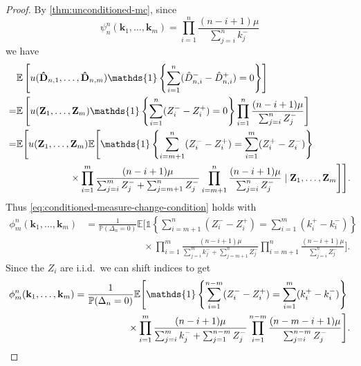 \documentclass[draft]{scrartcl}
\newcommand{\E}{\mathbb E}
\newcommand{\biasD}{\hat{D}}
\newcommand{\unconmc}{\psi}
\newcommand{\conmc}{\phi}
\newcommand{\indi}{\mathds{1}}
\newcommand{\vect}{\mathbf}
\renewcommand{\Pr}{\mathbb P}
\begin{document}
\begin{proof}
    By \cref{thm:unconditioned-mc}, since
    \begin{equation}
        \unconmc^n_n(\vect{k}_1, \ldots, \vect{k}_m) =
        \prod_{i=1}^n \frac{(n - i + 1) \mu}{\sum_{j=i}^n k_j^-}
    \end{equation}
    we have
    \begin{align}
        &\E\left[u(\vect{\biasD}_{n, 1}, \ldots, \vect{\biasD}_{n, m}) \indi\left\{ \sum_{i=1}^n (\biasD^-_{n, i} - \biasD^+_{n, i}) = 0 \right\} \right] \\
        = &\E\left[u(\vect{Z}_1, \ldots, \vect{Z}_m) \indi\left\{ \sum_{i=1}^n (Z_i^- - Z_i^+) = 0 \right\} \prod_{i=1}^n \frac{(n - i + 1) \mu}{\sum_{j=i}^n Z_j^-} \right] \\
        = &\E\Bigg[u(\vect{Z}_1, \ldots, \vect{Z}_m) \E \Bigg[ \indi\left\{ \sum_{i=m+1}^n (Z_i^- - Z_i^+) = \sum_{i=1}^m (Z^+_i - Z^-_i) \right\} \nonumber \\
       & \hspace{5.5em} \times \prod_{i=1}^m \frac{(n - i + 1)\mu}{\sum_{j=i}^m Z_j^- + \sum_{j = m+1}^n Z_j^-} \prod_{i=m+1}^n \frac{(n - i + 1) \mu}{\sum_{j=i}^n Z_j^-} \mid \vect{Z}_1, \ldots, \vect{Z}_m \Bigg] \Bigg].
    \end{align}
    Thus \cref{eq:conditioned-measure-change-condition} holds with
    \begin{align}
        \conmc^n_m(\vect{k}_1, \ldots, \vect{k}_m)
        &= \frac{1}{\Pr(\Delta_n = 0)}\E\Bigg[ \indi\left\{ \sum_{i=m+1}^n (Z_i^- - Z_i^+) = \sum_{i=1}^m (k^+_i - k^-_i)\right\} \nonumber \\
        &\hspace{6em} \times \prod_{i=1}^m \frac{(n - i + 1)\mu}{\sum_{j=i}^m k_j^- + \sum_{j = m+1}^n Z_j^-} \prod_{i=m+1}^n \frac{(n - i + 1) \mu}{\sum_{j=i}^n Z_j^-} \Bigg].
    \end{align}
    Since the $Z_i$ are i.i.d.\ we can shift indices to get
    \begin{align}
        \conmc^n_m(\vect{k}_1, \ldots, \vect{k}_m)
        &= \frac{1}{\Pr(\Delta_n = 0)}\E\Bigg[ \indi\left\{ \sum_{i=1}^{n-m} (Z_i^- - Z_i^+) = \sum_{i=1}^m (k^+_i - k^-_i)\right\} \nonumber \\
        &\hspace{5.5em} \times \prod_{i=1}^m \frac{(n - i + 1)\mu}{\sum_{j=i}^m k_j^- + \sum_{j = 1}^{n -m} Z_j^-} \prod_{i=1}^{n-m} \frac{(n - m - i + 1) \mu}{\sum_{j=i}^{n - m} Z_j^-} \Bigg].
    \end{align}

\end{proof}
\end{document}
